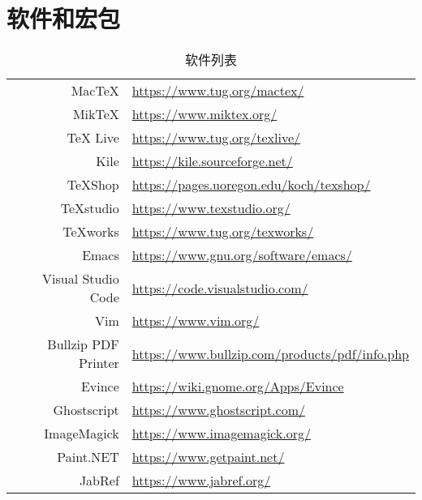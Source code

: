 \chapter{软件和宏包}

\begin{table}[!ht]
\caption{软件列表}
\label{tab:software_list}
\centering
\begin{tabular}{rl}
    \toprule
        MacTeX              & \url{https://www.tug.org/mactex/} \\
        MikTeX              & \url{https://www.miktex.org/} \\
        TeX Live            & \url{https://www.tug.org/texlive/} \\
    \midrule
        Kile                & \url{https://kile.sourceforge.net/} \\
        TeXShop             & \url{https://pages.uoregon.edu/koch/texshop/} \\
        TeXstudio           & \url{https://www.texstudio.org/} \\
        TeXworks            & \url{https://www.tug.org/texworks/} \\
    \midrule
        Emacs               & \url{https://www.gnu.org/software/emacs/} \\
        Visual Studio Code  & \url{https://code.visualstudio.com/} \\
        Vim                 & \url{https://www.vim.org/} \\
    \midrule
        Bullzip PDF Printer & \url{https://www.bullzip.com/products/pdf/info.php} \\
        Evince              & \url{https://wiki.gnome.org/Apps/Evince} \\
        Ghostscript         & \url{https://www.ghostscript.com/} \\
    \midrule
        ImageMagick         & \url{https://www.imagemagick.org/} \\
        Paint.NET           & \url{https://www.getpaint.net/} \\
    \midrule
        JabRef              & \url{https://www.jabref.org/} \\
    \bottomrule
\end{tabular}
\end{table}

\pagebreak[4]

